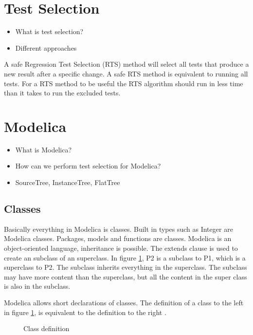 \documentclass{cslthse-msc}
\begin{document}
\section{Test Selection}
\begin{itemize}
	\item What is test selection?
	\item Different approaches
\end{itemize}
A safe Regression Test Selection (RTS) method will select all tests that produce a new result after a specific change. A safe RTS method is equivalent to running all tests. For a RTS method to be useful the RTS algorithm should run in less time than it takes to run the excluded tests.


\section{Modelica}
\begin{itemize}
	\item What is Modelica?
	\item How can we perform test selection for Modelica?
	\item SourceTree, InstanceTree, FlatTree
	\end{itemize}

\subsection{Classes}
Basically everything in Modelica is classes. Built in types such as Integer are Modelica classes. Packages, models and functions are classes. Modelica is an object-oriented language, inheritance is possible. The extends clause is used to create an subclass of an superclass. In figure \ref{fig:classDefinition}, P2 is a subclass to P1, which is a superclass to P2. The subclass inherits everything in the superclass. The subclass may have more content than the superclass, but all the content in the super class is also in the subclass. 

Modelica allows short declarations of classes. The definition of a class to the left in figure \ref{fig:classDefinition}, is equivalent to the definition to the right \cite{modelicamodelica}.

\begin{figure}[H]
    \centering
    \subfloat{{}}
    \qquad
    \subfloat{{}}
    \caption{Class definition}
    \label{fig:classDefinition}
\end{figure}
\end{document}
